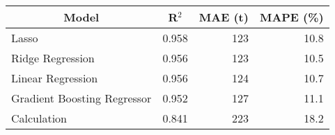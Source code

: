 
\begin{tabular}[t]{lrrr}
\toprule
\multicolumn{1}{c}{Model} & \multicolumn{1}{c}{R$^2$} & \multicolumn{1}{c}{MAE (t)} & \multicolumn{1}{c}{MAPE (\%)}\\
\midrule
Lasso & 0.958 & 123 & 10.8\\
Ridge Regression & 0.956 & 123 & 10.5\\
Linear Regression & 0.956 & 124 & 10.7\\
Gradient Boosting Regressor & 0.952 & 127 & 11.1\\
Calculation & 0.841 & 223 & 18.2\\
\bottomrule
\end{tabular}
